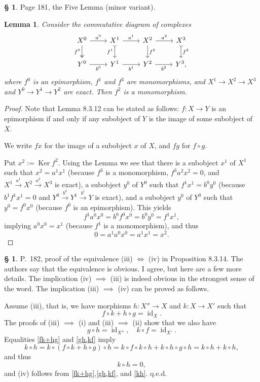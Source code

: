 \documentclass[12pt]{article}
\newtheorem{lem}[thm]{Lemma}
\theoremstyle{remark}
\theoremstyle{definition}
\newtheorem{s}[thm]{\S}
\newcommand{\mv}{ (minor variant)}
\DeclareMathOperator{\id}{id}
\DeclareMathOperator{\Ker}{Ker}
\begin{document}
\begin{s} 
Page 181, the Five Lemma\mv. 
%
\begin{lem} 
Consider the commutative diagram of complexes 
$$
\begin{tikzcd}
X^0\arrow[two heads]{d}[swap]{f^0}\arrow{r}{a^0}&
X^1\arrow[tail]{d}[swap]{f^1}\arrow{r}{a^1}&
X^2\arrow{d}{f^2}\arrow{r}{a^2}&
X^3\arrow[tail]{d}{f^3}\\ 
Y^0\arrow{r}[swap]{b^0}&
Y^1\arrow{r}[swap]{b^1}&
Y^2\arrow{r}[swap]{b^2}&
Y^3,
\end{tikzcd}
$$
where $f^0$ is an epimorphism, $f^1$ and $f^3$ are monomorphisms, and $X^1\to X^2\to X^3$ and $Y^0\to Y^1\to Y^2$ are exact. Then $f^2$ is a monomorphism. 
\end{lem} 
%
\begin{proof}
Note that Lemma 8.3.12 can be stated as follows: $f:X\to Y$ is an epimorphism if and only if any subobject of $Y$ is the image of some subobject of $X$. 

We write $fx$ for the image of a subobject $x$ of $X$, and $fg$ for $f\circ g$.

Put $x^2:=\Ker f^2$. Using the Lemma we see that there is a subobject $x^1$ of $X^1$ such that $x^2=a^1x^1$ (because $f^3$ is a monomorphism, $f^3a^2x^2=0$, and $X^1\overset{a^1}{\to}X^2\overset{a^2}{\to}X^3$ is exact), a subobject $y^0$ of $Y^0$ such that $f^1x^1=b^0y^0$ (because $b^1f^1x^1=0$ and $Y^0\overset{b^0}{\to}Y^1\overset{b^1}{\to}Y$ is exact), and a subobject $y^0$ of $Y^0$ such that $y^0=f^0x^0$ (because $f^0$ is an epimorphism). This yields 
$$
f^1a^0x^0=b^0f^0x^0=b^0y^0=f^1x^1,
$$
implying $a^0x^0=x^1$ (because $f^1$ is a monomorphism), and thus 
$$
0=a^1a^0x^0=a^1x^1=x^2.
$$
\end{proof}
\end{s}
%
%
\begin{s} 
P.~182, proof of the equivalence (iii) $\iff$ (iv) in Proposition 8.3.14. The authors say that the equivalence is obvious. I agree, but here are a few more details. The implication (iv) $\implies$ (iii) is indeed obvious in the strongest sense of the word. The implication (iii) $\implies$ (iv) can be proved as follows. 

Assume (iii), that is, we have morphisms $h:X''\to X$ and $k:X\to X'$ such that 
\begin{equation}\label{fk+hg} 
f\circ k+h\circ g=\id_X.
\end{equation} 
The proofs of (iii) $\implies$ (i) and (iii) $\implies$ (ii) show that we also have 
\begin{equation}\label{gh,kf} 
g\circ h=\id_{X''},\quad k\circ f=\id_{X'}.
\end{equation} 
Equalities \eqref{fk+hg} and \eqref{gh,kf} imply 
$$
k\circ h=k\circ(f\circ k+h\circ g)\circ h=k\circ f\circ k\circ h+k\circ h\circ g\circ h=k\circ h+k\circ h,
$$ 
and thus 
\begin{equation}\label{kh} 
k\circ h=0, 
\end{equation} 
and (iv) follows from \eqref{fk+hg},\eqref{gh,kf}, and \eqref{kh}. q.e.d.
\end{s}
%
\end{document}
